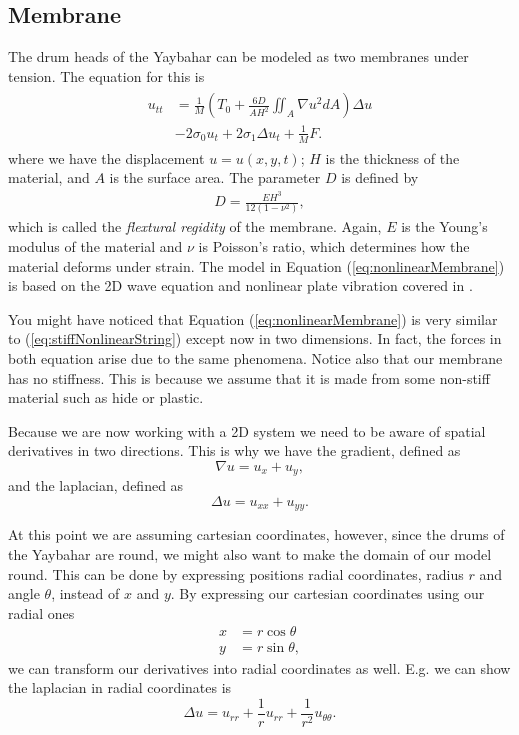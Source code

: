 \documentclass{article}
\begin{document}
\subsection{Membrane}
\label{sec:membrane}
The drum heads of the Yaybahar can be modeled as two membranes under tension.
The equation for this is
\begin{align}
  \label{eq:nonlinearMembrane}
  \begin{split}
  u_{tt} &= \frac{1}{M} \left(T_0 + \frac{6D}{A H^2} \iint_A \nabla u^2 dA \right)\Delta u \\
  &- 2 \sigma_0 u_t + 2 \sigma_1 \Delta u_t + \frac{1}{M} F.
  \end{split}
\end{align}
where we have the displacement $u = u(x, y, t)$; $H$ is the thickness of the material, and $A$ is the surface area.
The parameter $D$ is defined by
\begin{align}
  D = \frac{E H^3}{12 (1 - \nu^2)},
\end{align}
which is called the \textit{flextural regidity} of the membrane. Again, $E$ is the Young's modulus of the material and $\nu$ is Poisson's ratio, which determines how the material deforms under strain.
The model in Equation (\ref{eq:nonlinearMembrane}) is based on the 2D wave equation and nonlinear plate vibration covered in \cite[Chapters~11, 12, and 13]{bilbao_numerical_2009}.

You might have noticed that Equation (\ref{eq:nonlinearMembrane}) is very similar to (\ref{eq:stiffNonlinearString}) except now in two dimensions.
In fact, the forces in both equation arise due to the same phenomena.
Notice also that our membrane has no stiffness.
This is because we assume that it is made from some non-stiff material such as hide or plastic.

Because we are now working with a 2D system we need to be aware of spatial derivatives in two directions.
This is why we have the gradient, defined as
\begin{equation}
  \nabla u = u_x + u_y,
\end{equation}
and the laplacian, defined as
\begin{equation}
  \Delta u = u_{xx} + u_{yy}.
\end{equation}

At this point we are assuming cartesian coordinates, however, since the drums of the Yaybahar are round, we might also want to make the domain of our model round.
This can be done by expressing positions radial coordinates, radius $r$ and angle $\theta$, instead of $x$ and $y$.
By expressing our cartesian coordinates using our radial ones
\begin{align}
  x &= r \cos \theta\\
  y &= r \sin \theta,
\end{align}
we can transform our derivatives into radial coordinates as well.
E.g. we can show the laplacian in radial coordinates is
\begin{equation}
  \Delta u = u_{rr} + \frac{1}{r} u_{rr} + \frac{1}{r^2} u_{\theta \theta}.
\end{equation}
\end{document}
